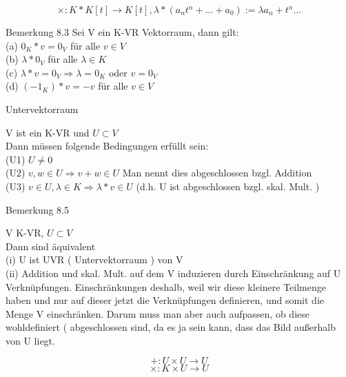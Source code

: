 \documentclass[smallheadings,12pt,a4paper]{scrartcl}
\begin{document}
$$ \times : K * K[t] \rightarrow K[t] , \lambda * (a_n t^n + ... + a_0 ) := \lambda a_n + t^n ... $$ 

\item[Bemerkung 8.3]
Sei V ein K-VR Vektorraum, dann gilt: \\


(a) $ 0_K * v= 0_V $ für alle $ v \in V $ \\

(b) $\lambda * 0_V $ für alle $\lambda \in K $ \\

(c) $\lambda * v = 0_V  \Rightarrow \lambda = 0_K $ oder $ v = 0_V$ \\

(d) $(-1_K) * v = -v $ für alle $v\in V$ \\

\newpage

\begin{center}
\item[Untervektorraum]
\end{center}
\item V ist ein K-VR und $ U \subset V $ \\
Dann müssen folgende Bedingungen erfüllt sein: \\

(U1) $ U \neq 0 $ \\
(U2) $v,w \in U \Rightarrow v+w \in U $ Man nennt dies abgeschlossen bzgl. Addition  \\
(U3) $v \in U , \lambda \in K  \Rightarrow \lambda  * v \in U $ (d.h. U ist abgeschlossen bzgl. skal. Mult. )\\

\item[Bemerkung 8.5]
\item V K-VR, $ U \subset V $ \\
Dann sind äquivalent \\

(i) U ist UVR ( Untervektorraum ) von V \\

(ii) Addition und skal. Mult. auf dem V induzieren durch Einschränkung auf U Verknüpfungen. Einschränkungen deshalb, weil wir diese kleinere Teilmenge haben und nur auf dieser jetzt die Verknüpfungen definieren, und somit die Menge V einschränken. Darum muss man aber auch aufpassen, ob diese wohldefiniert ( abgeschlossen sind, da es ja sein kann, dass das Bild außerhalb von U liegt. 

$$ +: U \times U \rightarrow U $$
$$ \times: K \times U \rightarrow U $$ 
\end{document}
